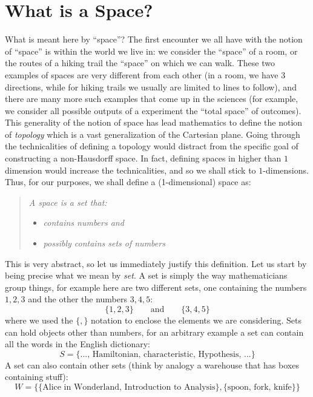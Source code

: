 \documentclass{article}
\begin{document}
\section{What is a Space?}

What is meant here by ``space''? The first encounter we all have with the notion of ``space'' is within the
world we live in: we consider the ``space'' of a room, or the routes of a hiking trail the ``space'' on which
we can walk. These two examples of spaces are very different from each other (in a room, we have 3 directions,
while for hiking trails we usually are limited to lines to follow), and there are many more such examples that
come up in the sciences (for example, we consider all possible outputs of a experiment the ``total space'' of
outcomes). This generality of the notion of space has lead mathematics to define the notion of \emph{topology}
which is a vast generalization of the Cartesian plane. Going through the technicalities of defining a topology
would distract from the specific goal of constructing a non-Hausdorff space. In fact, defining spaces in
higher than $1$ dimension would increase the technicalities, and so we shall stick to $1$-dimensions.
Thus, for our purposes, we shall define a (1-dimensional) space
as:

\begin{quote}
  \emph{A space is a set that:}
\begin{itemize}
  \item \emph{contains numbers and}
  \item \emph{possibly contains sets of numbers}
\end{itemize}
\end{quote}
This is very abstract, so let us immediately justify this definition. Let us start by being precise what we
mean by \emph{set}. A set is simply the way mathematicians group things, for example here are two
different sets, one containing the numbers $1,2,3$ and the other the numbers $3,4,5$:
\[
  \{1,2,3\} \qquad \text{and} \qquad \{3,4,5\}
\]
where we used the $\{, \}$ notation to enclose the elements we are considering. Sets can hold objects other
than numbers, for an arbitrary example a set can contain all the words in the English dictionary:
\[
  S = \{\text{..., Hamiltonian, characteristic, Hypothesis, ...}\}
\]
A set can also contain other sets (think by analogy a warehouse that has boxes containing stuff):
\[
  W = \{\{\text{Alice in Wonderland, Introduction to Analysis}\}, \{\text{spoon, fork, knife}\}\}
\]
\end{document}
